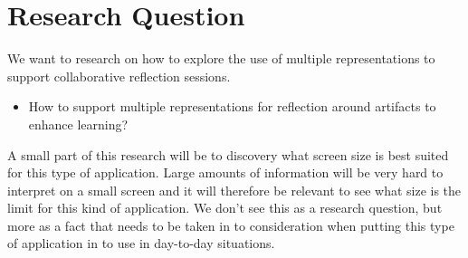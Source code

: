 \section{Research Question}
We want to research on how to explore the use of multiple representations to support collaborative reflection sessions.

\begin{itemize}
	\item How to support multiple representations for reflection around artifacts to enhance learning?
\end{itemize}

A small part of this research will be to discovery what screen size is best suited for this type of application. Large amounts of information will be very hard to interpret on a small screen and it will therefore be relevant to see what size is the limit for this kind of application. We don’t see this as a research question, but more as a fact that needs to be taken in to consideration when putting this type of application in to use in day-to-day situations.